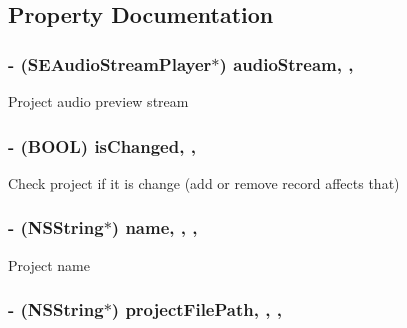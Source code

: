 

\subsection{Property Documentation}
\hypertarget{interface_s_e_project_af35059bb818d498c8a96053818016a26}{
\subsubsection[{audio\-Stream}]{\setlength{\rightskip}{0pt plus 5cm}-\/ ({\bf S\-E\-Audio\-Stream\-Player}$\ast$) audio\-Stream\hspace{0.3cm}{\ttfamily [read]}, {\ttfamily [nonatomic]}, {\ttfamily [assign]}}}\label{interface_s_e_project_af35059bb818d498c8a96053818016a26}
Project audio preview stream \hypertarget{interface_s_e_project_a4da84c0c1ef729881956646b15762cc9}{
\subsubsection[{is\-Changed}]{\setlength{\rightskip}{0pt plus 5cm}-\/ (B\-O\-O\-L) is\-Changed\hspace{0.3cm}{\ttfamily [read]}, {\ttfamily [nonatomic]}, {\ttfamily [assign]}}}\label{interface_s_e_project_a4da84c0c1ef729881956646b15762cc9}
Check project if it is change (add or remove record affects that) \hypertarget{interface_s_e_project_adf05552fc2cf324eb3511d3bd1b8a996}{
\subsubsection[{name}]{\setlength{\rightskip}{0pt plus 5cm}-\/ (N\-S\-String$\ast$) name\hspace{0.3cm}{\ttfamily [read]}, {\ttfamily [write]}, {\ttfamily [nonatomic]}, {\ttfamily [strong]}}}\label{interface_s_e_project_adf05552fc2cf324eb3511d3bd1b8a996}
Project name \hypertarget{interface_s_e_project_a2d54ed4720974d226ab30b8d32ef21dd}{
\subsubsection[{project\-File\-Path}]{\setlength{\rightskip}{0pt plus 5cm}-\/ (N\-S\-String$\ast$) project\-File\-Path\hspace{0.3cm}{\ttfamily [read]}, {\ttfamily [write]}, {\ttfamily [nonatomic]}, {\ttfamily [strong]}}}\label{interface_s_e_project_a2d54ed4720974d226ab30b8d32ef21dd}
